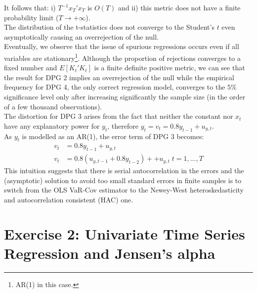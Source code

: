 \documentclass[12pt]{article}
\begin{document}
	It follows that: i) $T^{-1}x_{T}'x_{T}$ is $O(T)$ and ii) this metric does not have a finite probability limit ($T \to + \infty$). \\
	The distribution of the t-statistics does not converge to the Student's $t$ even asymptotically causing an overrejection of the null.\\
	Eventually, we observe that the issue of spurious regressions occurs even if all variables are stationary\footnote{AR(1) in this case.}.
	Although the proportion of rejections converges to a fixed number and $E[K_{t}'K_{t}]$ is a finite definite positive metric, we can see that the result for DPG 2 implies an overrejection of the null while the empirical frequency for DPG 4, the only correct regression model, converges to the $5\%$ significance level only after increasing significantly the sample size (in the order of a few thousand observations). \\  
	The distortion for DPG 3 arises from the fact that neither the constant nor $x_t$ have any explanatory power for $y_t$, therefore $y_t = v_t = 0.8y_{t-1}+u_{y,t}$.\\ As $y_t$ is modelled as an AR(1), the error term of DPG 3 becomes:
	\begin{align*}
	v_t &= 0.8y_{t-1}+u_{y,t} \\
	v_t &= 0.8(u_{y,t-1} + 0.8y_{t-2}) + +u_{y,t} \; t=1,...,T
	\end{align*}
	This intuition suggests that there is serial autocorrelation in the errors and the (asymptotic) solution to avoid too small standard errors in finite samples is to switch from the OLS VaR-Cov estimator to the Newey-West heteroskedasticity and autocorrelation consistent (HAC) one.
	\section{Exercise 2: Univariate Time Series Regression and Jensen's alpha}
\end{document}
